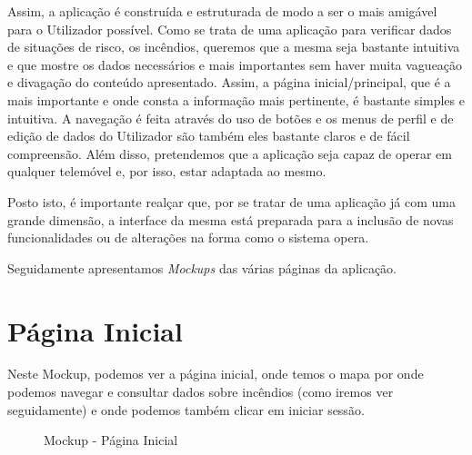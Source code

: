\documentclass[a4paper,12pt]{scrreprt}
\newcommand{\tab}{
    \hspace{1cm}}
\begin{document}
\tab Assim, a aplicação é construída e estruturada de modo a ser o mais amigável para o Utilizador possível. Como se trata de uma aplicação para verificar dados de situações de risco, os incêndios, queremos que a mesma seja bastante intuitiva e que mostre os dados necessários e mais importantes sem haver muita vagueação e divagação do conteúdo apresentado. Assim, a página inicial/principal, que é a mais importante e onde consta a informação mais pertinente, é bastante simples e intuitiva. A navegação é feita através do uso de botões e os menus de perfil e de edição de dados do Utilizador são também eles bastante claros e de fácil compreensão. Além disso, pretendemos que a aplicação seja capaz de operar em qualquer telemóvel e, por isso, estar adaptada ao mesmo.

\tab Posto isto, é importante realçar que, por se tratar de uma aplicação já com uma grande dimensão, a interface da mesma está preparada para a inclusão de novas funcionalidades ou de alterações na forma como o sistema opera.

\tab Seguidamente apresentamos \textit{Mockups} das várias páginas da aplicação. 

\clearpage

\section{Página Inicial}

\tab Neste Mockup, podemos ver a página inicial, onde temos o mapa por onde podemos navegar e consultar dados sobre incêndios (como iremos ver seguidamente) e onde podemos também clicar em iniciar sessão.

\vspace{1cm}

\begin{figure}[hbt!]
    \centering
    \caption{Mockup - Página Inicial}
\end{figure}
\clearpage
\end{document}
